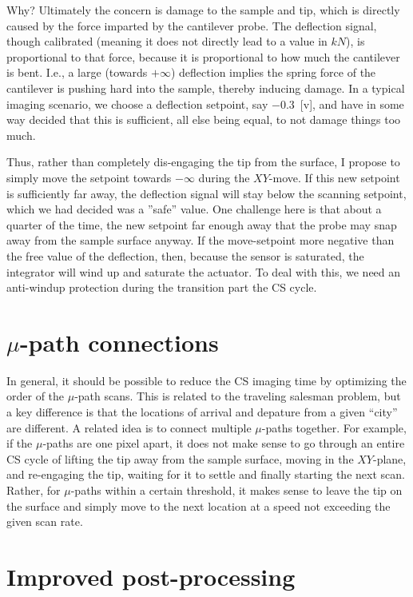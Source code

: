 \documentclass[11pt]{article}
\begin{document}
Why? Ultimately the concern is damage to the sample and tip, which is directly caused by the force imparted by the cantilever probe. The deflection signal, though calibrated (meaning it does not directly lead to a value in $kN$), is proportional to that force, because it is proportional to how much the cantilever is bent. I.e., a large (towards $+\infty$) deflection implies the spring force of the cantilever is pushing hard into the sample, thereby inducing damage. In a typical imaging scenario, we choose a deflection setpoint, say $-0.3$~[v], and have in some way decided that this is sufficient, all else being equal, to not damage things too much.

Thus, rather than completely dis-engaging the tip from the surface, I propose to simply move the setpoint towards $-\infty$ during the $XY$-move. If this new setpoint is sufficiently far away, the deflection signal will stay below the scanning setpoint, which we had decided was a ''safe'' value. One challenge here is that about a quarter of the time, the new setpoint far enough away that the probe may snap away from the sample surface anyway. If the move-setpoint more negative than the free value of the deflection, then, because the sensor is saturated, the integrator will wind up and saturate the actuator. To deal with this, we need an anti-windup protection during the transition part the CS cycle.

\section{$\mu$-path connections}
In general, it should be possible to reduce the CS imaging time by optimizing the order of the $\mu$-path scans. This is related to the traveling salesman problem, but a key difference is that the locations of arrival and depature from a given ``city'' are different. A related idea is to connect multiple $\mu$-paths together. For example, if the $\mu$-paths are one pixel apart, it does not make sense to go through an entire CS cycle of lifting the tip away from the sample surface, moving in the $XY$-plane, and re-engaging the tip, waiting for it to settle and finally starting the next scan. Rather, for $\mu$-paths within a certain threshold, it makes sense to leave the tip on the surface and simply move to the next location at a speed not exceeding the given scan rate. 

\section{Improved post-processing}
\end{document}
